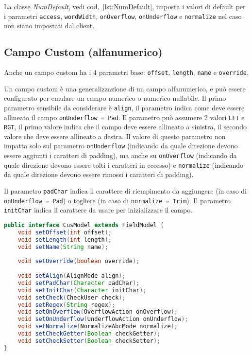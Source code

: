 \documentclass[a4paper,10pt]{report}
\begin{document}
La classe \textsl{NumDefault}, vedi cod.~\ref{lst:NumDefault}, imposta i valori
di default per i parametri \verb!access!, \verb!wordWidth!, \verb!onOverflow!, 
\verb!onUnderflow! e \verb!normalize! nel caso non siano  impostati dal client.


\subsection{Campo Custom (alfanumerico)}
Anche un campo custom ha i 4 parametri base: \verb!offset!, \verb!length!,
\verb!name! e \verb!override!.

Un campo custom è una generalizzazione di un campo alfanumerico, e può essere 
configurato per emulare un campo numerico o numerico nullabile.
Il primo parametro sensibile da considerare è \verb!align!, il parametro indica
come deve essere allineato il campo \texttt{onUnderflow = Pad}.
Il parametro può assumere 2 valori \verb!LFT! e \verb!RGT!, il primo valore 
indica che il campo deve essere allineato a sinistra, il secondo valore che 
deve essere allineato a destra.
Il valore di questo parametro non impatta solo sul parametro \verb!onUnderflow!
(indicando da quale direzione devono essere aggiunti i caratteri di padding),
ma anche su \verb!onOverflow! (indicando da quale direzione devono essere tolti
i caratteri in eccesso) e \verb!normalize! (indicando da quale direzione devono
essere rimossi i caratteri di padding).

Il parametro \verb!padChar! indica il carattere di riempimento da aggiungere
(in caso di \texttt{onUnderflow = Pad}) o togliere (in caso di 
\texttt{normalize = Trim}).
Il parametro \verb!initChar! indica il carattere da usare per inizializzare il
campo.

\begin{figure*}[!htb]
\begin{lstlisting}[language=java, 
caption=interfaccia CusModel (campo custom), 
label=lst:CusModel]
public interface CusModel extends FieldModel {
    void setOffset(int offset);
    void setLength(int length);
    void setName(String name);
    
    void setOverride(boolean override);
    
    void setAlign(AlignMode align);
    void setPadChar(Character padChar);
    void setInitChar(Character initChar);
    void setCheck(CheckUser check);
    void setRegex(String regex);
    void setOnOverflow(OverflowAction onOverflow);
    void setOnUnderflow(UnderflowAction onUnderflow);
    void setNormalize(NormalizeAbcMode normalize);
    void setCheckGetter(Boolean checkGetter);
    void setCheckSetter(Boolean checkSetter);
}
\end{lstlisting}
\end{figure*}
\end{document}
